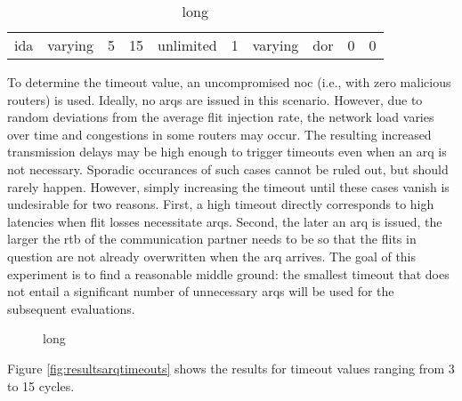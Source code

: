 \begin{table}
    \centering
    \begin{tabulary}{\textwidth}{C|C|C|C|C|C|C|C|C|C}
        \pProtVar{} & \pNCMode{} & \pEncMods{} & \pAuthMods{} & \pRQSize{} & \pARQLimit{} & \pARQTimeout{} & \pRStrat{} & \pNumAttackers{} & \pAttackProb{} \\\hline
        \gls{ida}   & varying    & 5           & 15           & unlimited  & 1            & varying        & \gls{dor}  & 0                & 0 \\
    \end{tabulary}
    \caption[Input parameters for ARQ timeouts experiment]{long}
    \label{tab:setuparqtimeouts}
\end{table}

To determine the timeout value, an uncompromised \gls{noc} (i.e., with zero malicious routers) is used. Ideally, no \glspl{arq} are issued in this
scenario. However, due to random deviations from the average flit injection rate, the network load varies over time and congestions in some routers
may occur. The resulting increased transmission delays may be high enough to trigger timeouts even when an \gls{arq} is not necessary. Sporadic
occurances of such cases cannot be ruled out, but should rarely happen. However, simply increasing the timeout until these cases vanish is undesirable
for two reasons. First, a high timeout directly corresponds to high latencies when flit losses necessitate \glspl{arq}. Second, the later an \gls{arq}
is issued, the larger the \gls{rtb} of the communication partner needs to be so that the flits in question are not already overwritten when the
\gls{arq} arrives. The goal of this experiment is to find a reasonable middle ground: the smallest timeout that does not entail a significant number of
unnecessary \glspl{arq} will be used for the subsequent evaluations.

\begin{figure}
    \centering
    
    \caption[Results for ARQ timeouts experiment]{long}
    \label{fig:resultsarqtimeouts}
\end{figure}

Figure \vref{fig:resultsarqtimeouts} shows the results for timeout values ranging from 3 to 15 cycles.

